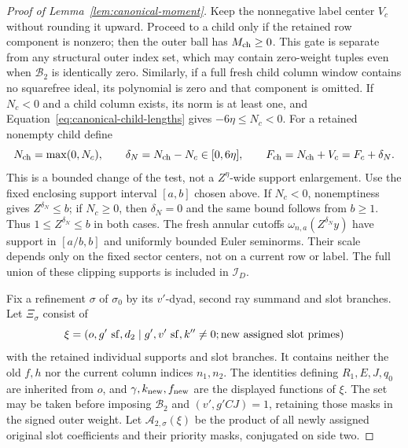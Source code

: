 \documentclass[11pt,a4paper]{article}
\numberwithin{equation}{section}
\numberwithin{figure}{section}
\theoremstyle{definition}
\theoremstyle{remark}
\begin{document}
\begin{proof}[Proof of Lemma~\ref{lem:canonical-moment}]
Keep the nonnegative label center \(V_c\) without rounding it upward.
Proceed to a child only if the retained row component is nonzero; then
the outer ball has \(M_{\rm ch}\ge0\).  This gate is separate from any
structural outer index set, which may contain zero-weight tuples even
when \(\mathcal B_2\) is identically zero.  Similarly, if a full fresh
child column window contains no squarefree ideal, its polynomial is zero
and that component is omitted.  If \(N_c<0\) and a child column exists, its norm is at least one, and
Equation~\eqref{eq:canonical-child-lengths} gives \(-6\eta\le N_c<0\).
For a retained nonempty child define
\begin{equation}\label{eq:inverse-child-clipping}
 N_{\rm ch}=\max(0,N_c),\qquad \delta_N=N_{\rm ch}-N_c\in[0,6\eta],
 \qquad F_{\rm ch}=N_{\rm ch}+V_c=F_c+\delta_N.
\end{equation}
This is a bounded change of the test, not a \(Z^\eta\)-wide support
enlargement. Use the fixed enclosing support interval \([a,b]\)
chosen above. If
\(N_c<0\), nonemptiness gives \(Z^{\delta_N}\le b\); if \(N_c\ge0\),
then \(\delta_N=0\) and the same bound follows from \(b\ge1\).
Thus \(1\le Z^{\delta_N}\le b\) in both cases.  The fresh annular cutoffs
\(\omega_{n,a}(Z^{\delta_N}y)\) have support in \([a/b,b]\) and uniformly
bounded Euler seminorms. Their scale depends only on the fixed sector
centers, not on a current row or label.  The full union of these clipping
supports is included in \(\mathcal I_D\).

Fix a refinement \(\sigma\) of \(\sigma_0\) by its \(v'\)-dyad,
second ray summand and slot branches.
Let \(\Xi_\sigma\) consist of
\[
 \xi=(o,g'\ {\rm sf},d_2\mid g',v'\ {\rm sf},k''\ne0;
               \text{new assigned slot primes})
\]
with the retained individual supports and slot branches.  It contains
neither the old \(f,h\) nor the current column indices \(n_1,n_2\).
The identities defining \(R_1,E,J,q_0\) are inherited from \(o\),
and \(\gamma,k_{\rm new},f_{\rm new}\) are the displayed functions of
\(\xi\).  The set may be taken before imposing \(\mathcal B_2\) and
\((v',g'CJ)=1\), retaining those masks in the signed outer weight.  Let
\(\mathcal A_{2,\sigma}(\xi)\) be the product of all newly assigned
original slot coefficients and their priority masks, conjugated on
side two.


\end{proof}
\end{document}
